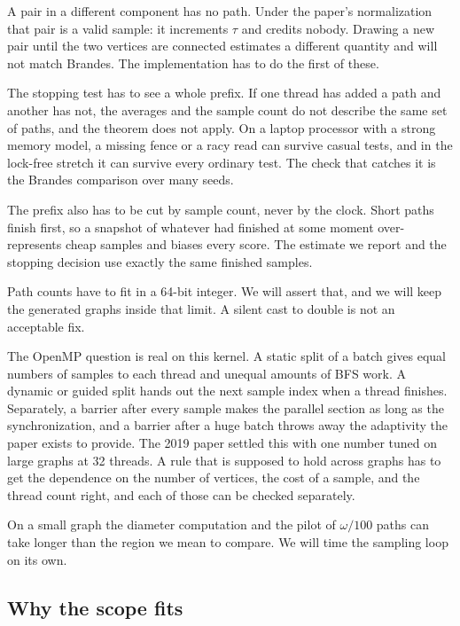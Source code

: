 \documentclass[11pt]{article}
\begin{document}
A pair in a different component has no path. Under the paper's normalization that pair is a valid sample: it increments $\tau$ and credits nobody. Drawing a new pair until the two vertices are connected estimates a different quantity and will not match Brandes. The implementation has to do the first of these.

The stopping test has to see a whole prefix. If one thread has added a path and another has not, the averages and the sample count do not describe the same set of paths, and the theorem does not apply. On a laptop processor with a strong memory model, a missing fence or a racy read can survive casual tests, and in the lock-free stretch it can survive every ordinary test. The check that catches it is the Brandes comparison over many seeds.

The prefix also has to be cut by sample count, never by the clock. Short paths finish first, so a snapshot of whatever had finished at some moment over-represents cheap samples and biases every score. The estimate we report and the stopping decision use exactly the same finished samples.

Path counts have to fit in a 64-bit integer. We will assert that, and we will keep the generated graphs inside that limit. A silent cast to double is not an acceptable fix.

The OpenMP question is real on this kernel. A static split of a batch gives equal numbers of samples to each thread and unequal amounts of BFS work. A dynamic or guided split hands out the next sample index when a thread finishes. Separately, a barrier after every sample makes the parallel section as long as the synchronization, and a barrier after a huge batch throws away the adaptivity the paper exists to provide. The 2019 paper settled this with one number tuned on large graphs at 32 threads. A rule that is supposed to hold across graphs has to get the dependence on the number of vertices, the cost of a sample, and the thread count right, and each of those can be checked separately.

On a small graph the diameter computation and the pilot of $\omega/100$ paths can take longer than the region we mean to compare. We will time the sampling loop on its own.

\subsection{Why the scope fits}
\end{document}
